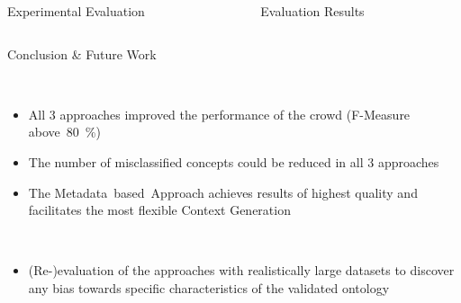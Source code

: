 \documentclass[final,hyperref={pdfpagelabels=true}]{beamer}
\begin{document}
\begin{frame}
\begin{columns}[t, onlytextwidth]
\begin{column}{\textwidth}
\begin{columns}[t, onlytextwidth]
\begin{column}{.49\textwidth}
\begin{block}{Experimental Evaluation}
\begin{minipage}[t][.2\textheight][c]{\textwidth}
					\end{minipage}
				\end{block}
			\end{column}
			\begin{column}{.49\textwidth}
				\begin{block}{Evaluation Results}
					\begin{minipage}[t][.2\textheight][c]{\textwidth}
					\end{minipage}
				\end{block}
			\end{column}
		\end{columns}
		\begin{columns}[t, onlytextwidth]
			\begin{column}{\textwidth}
				\begin{block}{Conclusion \& Future Work}
					\hfill
					\begin{minipage}[t][.09\textheight][c]{0.97\textwidth}
						\begin{multicols}{2}
							\footnotesize
							{}\\
							\vspace{-5mm}
							\begin{itemize}
								\footnotesize
								\justifying
								\setlength\itemsep{5mm}
								\item All 3 approaches improved the performance of the crowd (F-Measure above~80~\%)
								\item The number of misclassified concepts could be reduced in all 3 approaches
								\item The Metadata~based~Approach achieves results of highest quality and facilitates the most flexible Context Generation
							\end{itemize}
							\footnotesize
							{}\\
							\vspace{-1cm}
							\begin{itemize}
								\footnotesize
								\justifying
								\setlength\itemsep{5mm}
								\item (Re-)evaluation of the approaches with realistically large datasets to discover any bias towards specific characteristics of the validated ontology

\end{itemize}
\end{multicols}
\end{minipage}
\end{block}
\end{column}
\end{columns}
\end{column}
\end{columns}
\end{frame}
\end{document}
